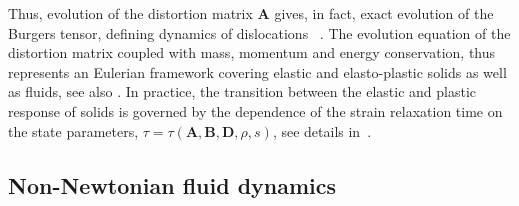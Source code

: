 \documentclass[twoside]{article}
\newcommand{\AAA}{{\boldsymbol{A}}}
\newcommand{\DD}{{\boldsymbol{D}}}
\newcommand{\BB}{{\boldsymbol{B}}}
\begin{document}
Thus, evolution of the distortion matrix $ \AAA $ gives, in fact, exact 
evolution of the Burgers tensor, defining dynamics of dislocations~ 
\cite{God1978,GodRom1998,GodRom2003}. The evolution 
equation of the distortion matrix coupled with mass, momentum and energy 
conservation, thus represents an Eulerian framework covering elastic and 
elasto-plastic solids as well as fluids, see also 
\cite{HPR2016,DPRZ2016,HYP2016,Rom1989,BartonRom2010,Boscheri2016,Favrie2011}. 
In practice, the transition between the elastic and plastic response of solids 
is governed by the dependence of the strain relaxation time on the state 
parameters, $ \tau = \tau (\AAA,\BB,\DD,\rho,s) 
$, see details in~\cite{HYP2016,Rom1989,BartonRom2010,Boscheri2016,Favrie2011}.




\subsection{Non-Newtonian fluid dynamics}
\end{document}
